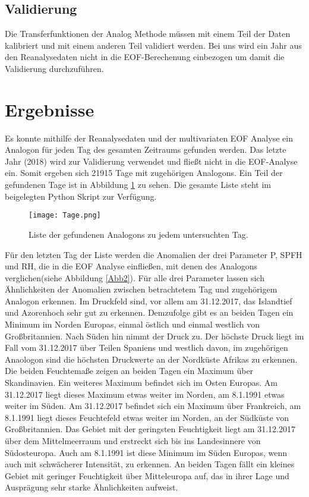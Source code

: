 \documentclass[12pt]{article}
\begin{document}
\subsection{Validierung}
Die Transferfunktionen der Analog Methode müssen mit einem Teil der Daten kalibriert und mit einem anderen Teil validiert werden. Bei uns wird ein Jahr aus den Reanalysedaten nicht in die EOF-Berechenung einbezogen um damit die Validierung durchzuführen.

\newpage
\section{Ergebnisse}
Es konnte mithilfe der Reanalysedaten und der multivariaten EOF Analyse ein Analogon für jeden Tag des gesamten Zeitraums gefunden werden. Das letzte Jahr (2018) wird zur Validierung verwendet und fließt nicht in die EOF-Analyse ein. Somit ergeben sich 21915 Tage mit zugehörigen Analogons. Ein Teil der gefundenen Tage ist in Abbildung \ref{Abb1} zu sehen. Die gesamte Liste steht im beigelegten Python Skript zur Verfügung.\\
\begin{figure} [!h]
\centering
\texttt{[image: Tage.png]}
\caption{Liste der gefundenen Analogons zu jedem untersuchten Tag.}
\label{Abb1}
\end{figure}
Für den letzten Tag der Liste werden die Anomalien der drei Parameter P, SPFH und RH, die in die EOF Analyse einfließen, mit denen des Analogons verglichen(siehe Abbildung \ref{Abb2}). Für alle drei Parameter lassen sich Ähnlichkeiten der Anomalien zwischen betrachtetem Tag und zugehörigem Analogon erkennen. Im Druckfeld sind, vor allem am 31.12.2017, das Islandtief und Azorenhoch sehr gut zu erkennen. Demzufolge gibt es an beiden Tagen ein Minimum im Norden Europas, einmal östlich und einmal westlich von Großbritannien. Nach Süden hin nimmt der Druck zu. Der höchste Druck liegt im Fall vom 31.12.2017 über Teilen Spaniens und westlich davon, im zugehörigen Anaologon sind die höchsten Druckwerte an der Nordküste Afrikas zu erkennen. \\
Die beiden Feuchtemaße zeigen an beiden Tagen ein Maximum über Skandinavien. Ein weiteres Maximum befindet sich im Osten Europas. Am 31.12.2017 liegt dieses Maximum etwas weiter im Norden, am 8.1.1991 etwas weiter im Süden. Am 31.12.2017 befindet sich ein Maximum über Frankreich, am 8.1.1991 liegt dieses Feuchtefeld etwas weiter im Norden, an der Südküste von Großbritannien. Das Gebiet mit der geringsten Feuchtigkeit liegt am 31.12.2017 über dem Mittelmeerraum und erstreckt sich bis ins Landesinnere von Südosteuropa. Auch am 8.1.1991 ist diese Minimum im Süden Europas, wenn auch mit schwächerer Intensität, zu erkennen. An beiden Tagen fällt ein kleines Gebiet mit geringer Feuchtigkeit über Mitteleuropa auf, das in ihrer Lage und Ausprägung sehr starke Ähnlichkeiten aufweist.
\end{document}
